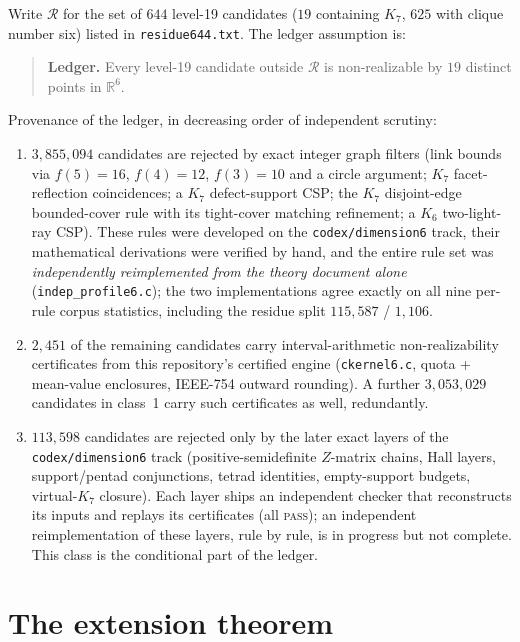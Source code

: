 \documentclass[11pt]{article}
\newcommand{\R}{\mathbb{R}}
\begin{document}
Write $\mathcal R$ for the set of $644$ level-19 candidates ($19$
containing $K_7$, $625$ with clique number six) listed in
\texttt{residue644.txt}. The ledger assumption is:

\begin{quote}
\textbf{Ledger.} Every level-19 candidate outside $\mathcal R$ is
non-realizable by $19$ distinct points in $\R^6$.
\end{quote}

Provenance of the ledger, in decreasing order of independent scrutiny:
\begin{enumerate}
\item $3{,}855{,}094$ candidates are rejected by exact integer graph
  filters (link bounds via $f(5)=16$, $f(4)=12$, $f(3)=10$ and a circle
  argument; $K_7$ facet-reflection coincidences; a $K_7$ defect-support
  CSP; the $K_7$ disjoint-edge bounded-cover rule with its tight-cover
  matching refinement; a $K_6$ two-light-ray CSP). These rules were
  developed on the \texttt{codex/dimension6} track, their mathematical
  derivations were verified by hand, and the entire rule set was
  \emph{independently reimplemented from the theory document alone}
  (\texttt{indep\_profile6.c}); the two implementations agree exactly on
  all nine per-rule corpus statistics, including the residue split
  $115{,}587$ / $1{,}106$.
\item $2{,}451$ of the remaining candidates carry interval-arithmetic
  non-realizability certificates from this repository's certified engine
  (\texttt{ckernel6.c}, quota + mean-value enclosures, IEEE-754 outward
  rounding). A further $3{,}053{,}029$ candidates in class~1 carry such
  certificates as well, redundantly.
\item $113{,}598$ candidates are rejected only by the later exact layers
  of the \texttt{codex/dimension6} track (positive-semidefinite
  $Z$-matrix chains, Hall layers, support/pentad conjunctions, tetrad
  identities, empty-support budgets, virtual-$K_7$ closure). Each layer
  ships an independent checker that reconstructs its inputs and replays
  its certificates (all \textsc{pass}); an independent reimplementation
  of these layers, rule by rule, is in progress but not complete. This
  class is the conditional part of the ledger.
\end{enumerate}

\section*{The extension theorem}
\end{document}
